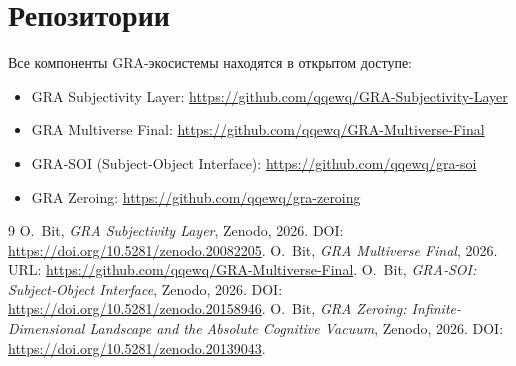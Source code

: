 \documentclass[a4paper,12pt]{article}
\begin{document}
\section*{Репозитории}
Все компоненты GRA-экосистемы находятся в открытом доступе:
\begin{itemize}
\item GRA Subjectivity Layer: \url{https://github.com/qqewq/GRA-Subjectivity-Layer}
\item GRA Multiverse Final: \url{https://github.com/qqewq/GRA-Multiverse-Final}
\item GRA‑SOI (Subject‑Object Interface): \url{https://github.com/qqewq/gra-soi}
\item GRA Zeroing: \url{https://github.com/qqewq/gra-zeroing}
\end{itemize}


\begin{thebibliography}{9}
 O.~Bit, \emph{GRA Subjectivity Layer}, Zenodo, 2026. DOI: \url{https://doi.org/10.5281/zenodo.20082205}.
 O.~Bit, \emph{GRA Multiverse Final}, 2026. URL: \url{https://github.com/qqewq/GRA-Multiverse-Final}.
 O.~Bit, \emph{GRA‑SOI: Subject‑Object Interface}, Zenodo, 2026. DOI: \url{https://doi.org/10.5281/zenodo.20158946}.
 O.~Bit, \emph{GRA Zeroing: Infinite-Dimensional Landscape and the Absolute Cognitive Vacuum}, Zenodo, 2026. DOI: \url{https://doi.org/10.5281/zenodo.20139043}.
\end{thebibliography}
\end{document}
